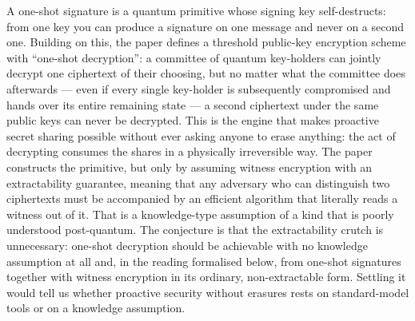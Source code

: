 \documentclass{aicr-conjecture}
\begin{document}

\vspace{0.4em}

\begin{informalconjecture}
A one-shot signature is a quantum primitive whose signing key
self-destructs: from one key you can produce a signature on one
message and never on a second one. Building on this, the paper defines
a threshold public-key encryption scheme with ``one-shot
decryption'': a committee of quantum key-holders can jointly decrypt
one ciphertext of their choosing, but no matter what the committee
does afterwards --- even if every single key-holder is subsequently
compromised and hands over its entire remaining state --- a second
ciphertext under the same public keys can never be decrypted. This is
the engine that makes proactive secret sharing possible without ever
asking anyone to erase anything: the act of decrypting consumes the
shares in a physically irreversible way. The paper constructs the
primitive, but only by assuming witness encryption with an
extractability guarantee, meaning that any adversary who can
distinguish two ciphertexts must be accompanied by an efficient
algorithm that literally reads a witness out of it. That is a
knowledge-type assumption of a kind that is poorly understood
post-quantum. The conjecture is that the extractability crutch is
unnecessary: one-shot decryption should be achievable with no
knowledge assumption at all and, in the reading formalised below, from
one-shot signatures together with witness encryption in its ordinary,
non-extractable form. Settling it would tell us whether proactive
security without erasures rests on standard-model tools or on a
knowledge assumption.
\end{informalconjecture}
\end{document}
